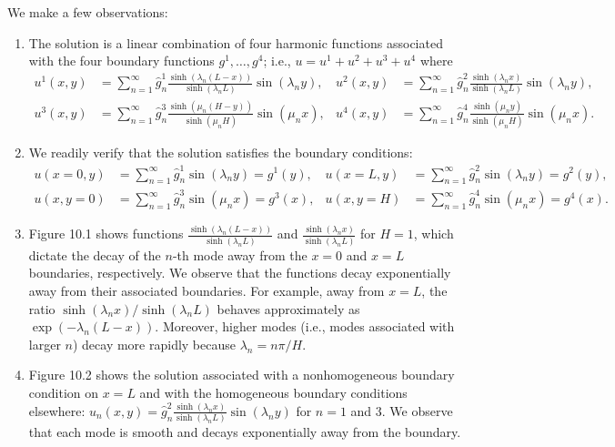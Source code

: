We make a few observations:
\begin{enumerate}
    \item The solution is a linear combination of four harmonic functions associated with the four boundary functions $g^1, \dots, g^4$; i.e., $u = u^1 + u^2 + u^3 + u^4$ where
    \begin{align*}
        u^1(x, y) &= \sum_{n=1}^{\infty} \hat{g}_n^1\frac{\sinh(\lambda_n(L - x))}{\sinh(\lambda_nL)}\sin(\lambda_ny), & u^2(x, y) &= \sum_{n=1}^{\infty} \hat{g}_n^2\frac{\sinh(\lambda_nx)}{\sinh(\lambda_nL)}\sin(\lambda_ny), \\
        u^3(x, y) &= \sum_{n=1}^{\infty} \hat{g}_n^3\frac{\sinh(\mu_n(H - y))}{\sinh(\mu_nH)}\sin(\mu_nx), & u^4(x, y) &= \sum_{n=1}^{\infty} \hat{g}_n^4\frac{\sinh(\mu_ny)}{\sinh(\mu_nH)}\sin(\mu_nx).
    \end{align*}
    \item We readily verify that the solution satisfies the boundary conditions:
    \begin{align*}
        u(x = 0, y) &= \sum_{n=1}^{\infty} \hat{g}_n^1\sin(\lambda_ny) = g^1(y), & u(x = L, y) &= \sum_{n=1}^{\infty} \hat{g}_n^2\sin(\lambda_ny) = g^2(y), \\
        u(x, y = 0) &= \sum_{n=1}^{\infty} \hat{g}_n^3\sin(\mu_nx) = g^3(x), & u(x, y = H) &= \sum_{n=1}^{\infty} \hat{g}_n^4\sin(\mu_nx) = g^4(x).
    \end{align*}
    \item Figure 10.1 shows functions $\frac{\sinh(\lambda_n(L - x))}{\sinh(\lambda_nL)}$ and $\frac{\sinh(\lambda_nx)}{\sinh(\lambda_nL)}$ for $H = 1$, which dictate the decay of the $n$-th mode away from the $x = 0$ and $x = L$ boundaries, respectively. We observe that the functions decay exponentially away from their associated boundaries. For example, away from $x = L$, the ratio $\sinh(\lambda_nx)/\sinh(\lambda_nL)$ behaves approximately as $\exp(-\lambda_n(L - x))$. Moreover, higher modes (i.e., modes associated with larger $n$) decay more rapidly because $\lambda_n = n\pi/H$.
    \item Figure 10.2 shows the solution associated with a nonhomogeneous boundary condition on $x = L$ and with the homogeneous boundary conditions elsewhere: $u_n(x, y) = \hat{g}_n^2\frac{\sinh(\lambda_nx)}{\sinh(\lambda_nL)}\sin(\lambda_ny)$ for $n = 1$ and 3. We observe that each mode is smooth and decays exponentially away from the boundary.
\end{enumerate}


